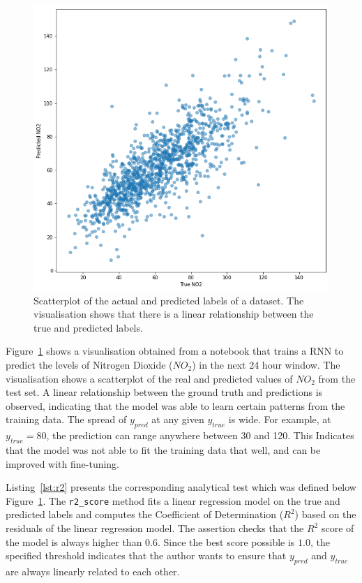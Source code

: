 \documentclass[conference]{IEEEtran}
\begin{document}
\begin{figure}
  \includegraphics[width=\linewidth]{../catalogue/select-332a.png}
  \caption{Scatterplot of the actual and predicted labels of a dataset. The visualisation shows that there is a linear relationship between the true and predicted labels.}\label{fig:r2}
\end{figure}

Figure~\ref{fig:r2} shows a visualisation obtained from a notebook that trains a RNN to predict the levels of Nitrogen Dioxide ($NO_2$) in the next 24 hour window. The visualisation shows a scatterplot of the real and predicted values of $NO_2$ from the test set. A linear relationship between the ground truth and predictions is observed, indicating that the model was able to learn certain patterns from the training data. The spread of $y_{pred}$ at any given $y_{true}$ is wide. For example, at $y_{true} = 80$, the prediction can range anywhere between 30 and 120. This Indicates that the model was not able to fit the training data that well, and can be improved with fine-tuning.

Listing~\ref{lst:r2} presents the corresponding analytical test which was defined below Figure~\ref{fig:r2}. The \texttt{r2\_score} method fits a linear regression model on the true and predicted labels and computes the Coefficient of Determination ($R^2$) based on the residuals of the linear regression model. The assertion checks that the $R^2$ score of the model is always higher than $0.6$. Since the best score possible is $1.0$, the specified threshold indicates that the author wants to ensure that $y_{pred}$ and $y_{true}$ are always linearly related to each other.
\end{document}
